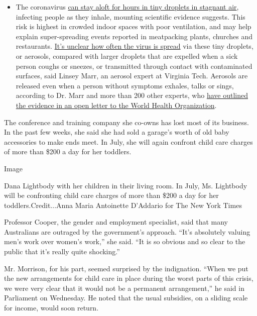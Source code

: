 \begin{itemize}
  \begin{itemize}
  \tightlist
  \item
    The coronavirus
    \href{https://www.nytimes.com/2020/07/04/health/239-experts-with-one-big-claim-the-coronavirus-is-airborne.html?action=click\&pgtype=Article\&state=default\&region=MAIN_CONTENT_3\&context=storylines_faq}{can
    stay aloft for hours in tiny droplets in stagnant air}, infecting
    people as they inhale, mounting scientific evidence suggests. This
    risk is highest in crowded indoor spaces with poor ventilation, and
    may help explain super-spreading events reported in meatpacking
    plants, churches and restaurants.
    \href{https://www.nytimes.com/2020/07/06/health/coronavirus-airborne-aerosols.html?action=click\&pgtype=Article\&state=default\&region=MAIN_CONTENT_3\&context=storylines_faq}{It's
    unclear how often the virus is spread} via these tiny droplets, or
    aerosols, compared with larger droplets that are expelled when a
    sick person coughs or sneezes, or transmitted through contact with
    contaminated surfaces, said Linsey Marr, an aerosol expert at
    Virginia Tech. Aerosols are released even when a person without
    symptoms exhales, talks or sings, according to Dr. Marr and more
    than 200 other experts, who
    \href{https://academic.oup.com/cid/article/doi/10.1093/cid/ciaa939/5867798}{have
    outlined the evidence in an open letter to the World Health
    Organization}.
  \end{itemize}
\end{itemize}

The conference and training company she co-owns has lost most of its
business. In the past few weeks, she said she had sold a garage's worth
of old baby accessories to make ends meet. In July, she will again
confront child care charges of more than \$200 a day for her toddlers.

Image

Dana Lightbody with her children in their living room. In July, Ms.
Lightbody will be confronting child care charges of more than \$200 a
day for her toddlers.Credit...Anna Maria Antoinette D'Addario for The
New York Times

Professor Cooper, the gender and employment specialist, said that many
Australians are outraged by the government's approach. ``It's absolutely
valuing men's work over women's work,'' she said. ``It is so obvious and
so clear to the public that it's really quite shocking.''

Mr. Morrison, for his part, seemed surprised by the indignation. ``When
we put the new arrangements for child care in place during the worst
parts of this crisis, we were very clear that it would not be a
permanent arrangement,'' he said in Parliament on Wednesday. He noted
that the usual subsidies, on a sliding scale for income, would soon
return.

